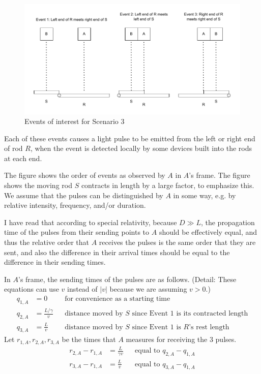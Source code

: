 \documentclass[a4paper]{article}
\theoremstyle{plain}
\theoremstyle{definition}
\begin{document}
\begin{figure}[ht]
	\centering
	\includegraphics[width=1.0\textwidth]{scenario3-events-cropped.pdf}
	\caption{Events of interest for Scenario 3}
	\label{fig:scenario3-events}
\end{figure}

Each of these events causes a light pulse to be emitted from the left
or right end of rod $R$, when the event is detected locally by some
devices built into the rods at each end.

The figure shows the order of events as observed by $A$ in $A$'s
frame.  The figure shows the moving rod $S$ contracts in length by a
large factor, to emphasize this.  We assume that the pulses can be
distinguished by $A$ in some way, e.g. by relative intensity,
frequency, and/or duration.

I have read that according to special relativity, because $D \gg L$,
the propagation time of the pulses from their sending points to $A$
should be effectively equal, and thus the relative order that $A$
receives the pulses is the same order that they are sent, and also the
difference in their arrival times should be equal to the difference in
their sending times.

In $A$'s frame, the sending times of the pulses are as follows.
(Detail: These equations can use $v$ instead of $|v|$ because
we are assuming $v > 0$.)
\begin{align*}
q_{1,A} & = 0 & & \text{for convenience as a starting time} \\
q_{2,A} & = \frac{L/\gamma}{v} & & \text{distance moved by $S$ since Event 1 is its contracted length} \\
q_{3,A} & = \frac{L}{v} & & \text{distance moved by $S$ since Event 1 is $R$'s rest length}
\end{align*}
Let $r_{1,A}, r_{2,A}, r_{3,A}$ be the times that $A$ measures for
receiving the 3 pulses.
\begin{align*}
r_{2,A} - r_{1,A} & = \frac{L}{\gamma v} & & \text{equal to $q_{2,A} - q_{1,A}$} \\
r_{3,A} - r_{1,A} & = \frac{L}{v} & & \text{equal to $q_{3,A} - q_{1,A}$}
\end{align*}
\end{document}
